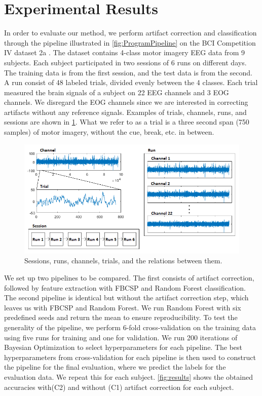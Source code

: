 \section{Experimental Results}\label{sec:results}
In order to evaluate our method, we perform artifact correction and classification through the pipeline illustrated in \cref{fig:ProgramPipeline} on the BCI Competition IV dataset 2a \citep{brunner2008bci}. The dataset contains 4-class motor imagery EEG data from 9 subjects. Each subject participated in two sessions of 6 runs on different days. The training data is from the first session, and the test data is from the second. A run consist of 48 labeled trials, divided evenly between the 4 classes. Each trial measured the brain signals of a subject on 22 EEG channels and 3 EOG channels. We disregard the EOG channels since we are interested in correcting artifacts without any reference signals. Examples of trials, channels, runs, and sessions are shown in \cref{fig:dataset}. What we refer to as a trial is a three second span (750 samples) of motor imagery, without the cue, break, etc. in between.

\begin{figure}
	\centering
	\begin{adjustbox}{width=\textwidth}
		\includegraphics{figures/bciiv2a.png}
	\end{adjustbox}
	\caption{Sessions, runs, channels, trials, and the relations between them.}
	\label{fig:dataset}
\end{figure}

We set up two pipelines to be compared. The first consists of artifact correction, followed by feature extraction with FBCSP and Random Forest classification. The second pipeline is identical but without the artifact correction step, which leaves us with FBCSP and Random Forest. We run Random Forest with six predefined seeds and return the mean to ensure reproducibility.
To test the generality of the pipeline, we perform 6-fold cross-validation on the training data using five runs for training and one for validation. We run 200 iterations of Bayesian Optimization to select hyperparameters for each pipeline. The best hyperparameters from cross-validation for each pipeline is then used to construct the pipeline for the final evaluation, where we predict the labels for the evaluation data. We repeat this for each subject. 
\cref{fig:results} shows the obtained accuracies with(C2) and without (C1) artifact correction for each subject.

